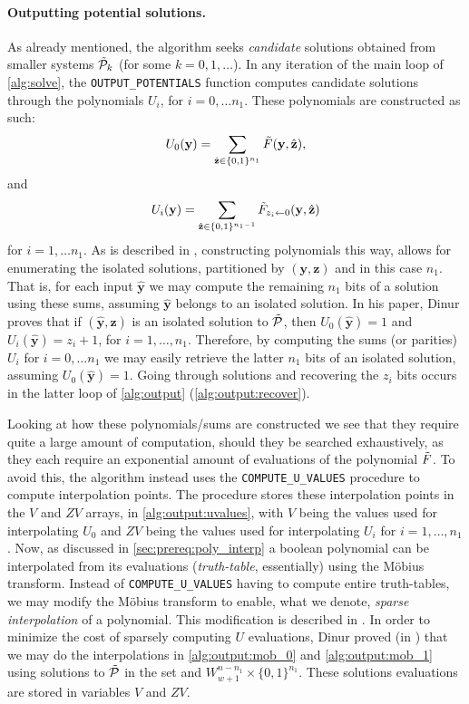 \paragraph{Outputting potential solutions.} As already mentioned, the algorithm seeks \textit{candidate} solutions obtained from smaller systems $\Tilde{\mathcal{P}}_k$ (for some $k = 0, 1,\dots $). In any iteration of the main loop of \cref{alg:solve}, the \texttt{OUTPUT\_POTENTIALS} function computes candidate solutions through the polynomials $U_i$, for $i = 0, \dots n_1$. These polynomials are constructed as such: 
$$
U_0(\mathbf{y}) = \sum_{\hat{\mathbf{z}} \in \{0,1\}^{n_1}} \Tilde{F}(\mathbf{y}, \hat{\mathbf{z}}),
$$
and
$$
U_i(\mathbf{y}) = \sum_{\hat{\mathbf{z}} \in \{0,1\}^{n_1 - 1}} \Tilde{F}_{z_i \leftarrow 0}(\mathbf{y}, \hat{\mathbf{z}})
$$
for $i = 1, \dots n_1$. As is described in \cite{eurocrypt-2021-30841}, constructing polynomials this way, allows for enumerating the isolated solutions, partitioned by $(\mathbf{y},\mathbf{z})$ and in this case $n_1$. That is, for each input $\hat{\mathbf{y}}$ we may compute the remaining $n_1$ bits of a solution using these sums, assuming $\hat{\mathbf{y}}$ belongs to an isolated solution. In his paper, Dinur proves that if $(\hat{\mathbf{y}}, \hat{\mathbf{z}})$ is an isolated solution to $\Tilde{\mathcal{P}}$, then $U_0(\hat{\mathbf{y}}) = 1$ and $U_i(\hat{\mathbf{y}}) = z_i + 1$, for $i = 1, \dots, n_1$. Therefore, by computing the sums (or parities) $U_i$ for $i = 0, \dots n_1$ we may easily retrieve the latter $n_1$ bits of an isolated solution, assuming $U_0(\hat{\mathbf{y}}) = 1$. Going through solutions and recovering the $z_i$ bits occurs in the latter loop of \cref{alg:output} (\cref{alg:output:recover}).

Looking at how these polynomials/sums are constructed we see that they require quite a large amount of computation, should they be searched exhaustively, as they each require an exponential amount of evaluations of the polynomial $\Tilde{F}$. To avoid this, the algorithm instead uses the \texttt{COMPUTE\_U\_VALUES} procedure to compute interpolation points. The procedure stores these interpolation points in the $V$ and $ZV$ arrays, in \cref{alg:output:uvalues}, with $V$ being the values used for interpolating $U_0$ and $ZV$ being the values used for interpolating $U_i$ for $i = 1, \dots, n_1$. Now, as discussed in \cref{sec:prereq:poly_interp} a boolean polynomial can be interpolated from its evaluations (\textit{truth-table}, essentially) using the Möbius transform. Instead of \texttt{COMPUTE\_U\_VALUES} having to compute entire truth-tables, we may modify the Möbius transform to enable, what we denote, \textit{sparse interpolation} of a polynomial. This modification is described in \cite{fse-2011-23547}. In order to minimize the cost of sparsely computing $U$ evaluations, Dinur proved (in \cite{eurocrypt-2021-30841}) that we may do the interpolations in \cref{alg:output:mob_0} and \cref{alg:output:mob_1} using solutions to $\Tilde{\mathcal{P}}$ in the set and $W^{n - n_1}_{w + 1} \times \{0, 1\}^{n_1}$. These solutions evaluations are stored in variables $V$ and $ZV$.

